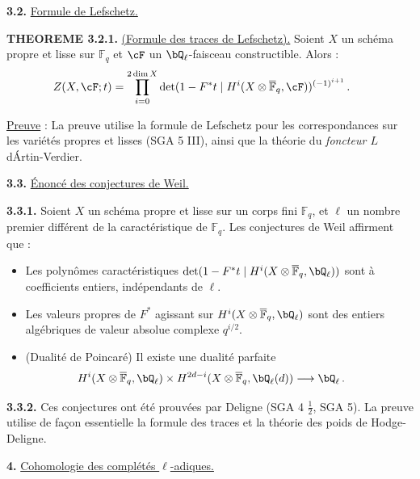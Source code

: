 \smallskip

\noindent
\textbf{3.2.} \underline{Formule de Lefschetz.}

\noindent
\textbf{THEOREME 3.2.1.} \underline{(Formule des traces de Lefschetz).} Soient $X$ un sch\'ema propre et lisse sur $\mathbb{F}_q$ et $\cF$ un $\bQ_{\ell}$-faisceau constructible. Alors :
\[
Z(X, \cF; t) = \prod_{i=0}^{2\dim X} \det(1 - F^* t \mid H^i(X \otimes \overline{\mathbb{F}}_q, \cF))^{(-1)^{i+1}}\,.\hspace*{0.5cm}
\]

\smallskip

\noindent
\underline{Preuve} : La preuve utilise la formule de Lefschetz pour les correspondances sur les vari\'et\'es propres et lisses (SGA 5 III), ainsi que la th\'eorie du \textsl{foncteur $L$} d\'Artin-Verdier.

\bigskip

\noindent
\textbf{3.3.} \underline{\'Enonc\'e des conjectures de Weil.}

\noindent
\textbf{3.3.1.} Soient $X$ un sch\'ema propre et lisse sur un corps fini $\mathbb{F}_q$, et $\ell$ un nombre premier diff\'erent de la caract\'eristique de $\mathbb{F}_q$. Les conjectures de Weil affirment que :
\begin{itemize}
\item[(i)] Les polyn\^omes caract\'eristiques $\det(1 - F^* t \mid H^i(X \otimes \overline{\mathbb{F}}_q, \bQ_{\ell}))$ sont \`a coefficients entiers, ind\'ependants de $\ell$.
\item[(ii)] Les valeurs propres de $F^*$ agissant sur $H^i(X \otimes \overline{\mathbb{F}}_q, \bQ_{\ell})$ sont des entiers alg\'ebriques de valeur absolue complexe $q^{i/2}$.
\item[(iii)] (Dualit\'e de Poincar\'e) Il existe une dualit\'e parfaite
\[
H^i(X \otimes \overline{\mathbb{F}}_q, \bQ_{\ell}) \times H^{2d-i}(X \otimes \overline{\mathbb{F}}_q, \bQ_{\ell}(d)) \longrightarrow \bQ_{\ell}\,.\hspace*{0.5cm}
\]
\end{itemize}

\smallskip

\noindent
\textbf{3.3.2.} Ces conjectures ont \'et\'e prouv\'ees par Deligne (SGA 4 $\frac{1}{2}$, SGA 5). La preuve utilise de fa\c con essentielle la formule des traces et la th\'eorie des poids de Hodge-Deligne.

\newpage

\noindent
\textbf{4.} \underline{Cohomologie des compl\'et\'es $\ell$-adiques.}

